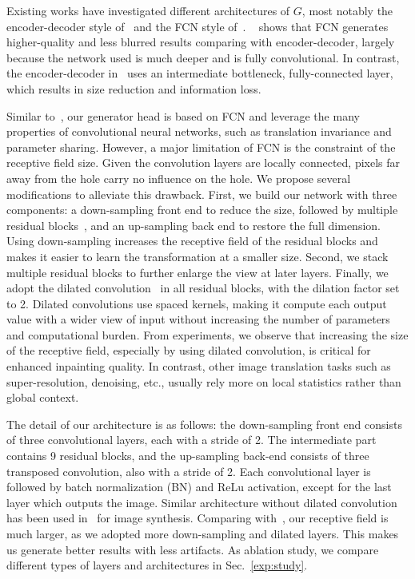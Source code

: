 Existing works have investigated different architectures of $G$, most notably the encoder-decoder style of~\cite{pathak2016context} and the FCN style of~\cite{iizuka2017globally}. ~\cite{iizuka2017globally} shows that FCN generates higher-quality and less blurred results comparing with encoder-decoder, largely because the network used is much deeper and is fully convolutional. In contrast, the encoder-decoder in~\cite{pathak2016context} uses an intermediate bottleneck, fully-connected layer, which results in size reduction and information loss. 

Similar to~\cite{iizuka2017globally}, our generator head is based on FCN and leverage the many properties of convolutional neural networks, such as translation invariance and parameter sharing. However, a major limitation of FCN is the constraint of the receptive field size. Given the convolution layers are locally connected, pixels far away from the hole carry no influence on the hole. We propose several modifications to alleviate this drawback. First, we build our network with three components: a down-sampling front end to reduce the size, followed by multiple residual blocks~\cite{he2016deep}, and an up-sampling back end to restore the full dimension. Using down-sampling increases the receptive field of the residual blocks and makes it easier to learn the transformation at a smaller size. Second, we stack multiple residual blocks to further enlarge the view at later layers. Finally, we adopt the dilated convolution~\cite{yu2015multi} in all residual blocks, with the dilation factor set to 2. Dilated convolutions use spaced kernels, making it compute each output value with a wider view of input without increasing the number of parameters and computational burden. From experiments, we observe that increasing the size of the receptive field, especially by using dilated convolution, is critical for enhanced inpainting quality. In contrast, other image translation tasks such as super-resolution, denoising, etc., usually rely more on local statistics rather than global context.

The detail of our architecture is as follows: the down-sampling front end consists of three convolutional layers, each with a stride of 2. The intermediate part contains 9 residual blocks, and the up-sampling back-end consists of three transposed convolution, also with a stride of 2. Each convolutional layer is followed by batch normalization (BN) and ReLu activation, except for the last layer which outputs the image. Similar architecture without dilated convolution has been used in~\cite{wang2017high} for image synthesis. Comparing with~\cite{iizuka2017globally}, our receptive field is much larger, as we adopted more down-sampling and dilated layers. This makes us generate better results with less artifacts. As ablation study, we compare different types of layers and architectures in Sec.~\ref{exp:study}.

